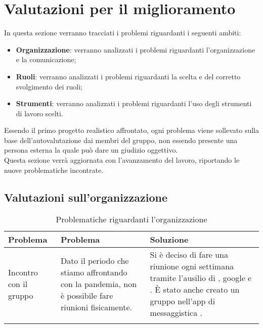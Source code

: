 \section{Valutazioni per il miglioramento}
In questa sezione verranno tracciati i problemi riguardanti i seguenti ambiti:
\begin{itemize}
	\item \textbf{Organizzazione}: verranno analizzati i problemi riguardanti l'organizzazione e la comunicazione;
	\item \textbf{Ruoli}: verranno analizzati i problemi riguardanti la scelta e del corretto svolgimento dei ruoli;
	\item \textbf{Strumenti}: verranno analizzati i problemi riguardanti l'uso degli strumenti di lavoro scelti.
\end{itemize}
Essendo il primo progetto realistico affrontato, ogni problema viene sollevato sulla base dell'autovalutazione dai membri del gruppo, non essendo presente una persona esterna la quale può dare un giudizio oggettivo.\\
Questa sezione verrà aggiornata con l'avanzamento del lavoro, riportando le nuove problematiche incontrate.
	\subsection{Valutazioni sull'organizzazione}
	\begin{center}
		\begin{longtable}{|C{2cm}|p{6cm}|p{6cm}|}
			\hline
			\textbf{Problema} & \textbf{Problema} & \textbf{Soluzione}  \\ 			
			\hline
			\endhead
			
			\hline
			Incontro con il gruppo & Dato il periodo che stiamo affrontando con la pandemia, non è possibile fare riunioni fisicamente. & Si è deciso di fare una riunione ogni settimana tramite l'ausilio di , google  e . È stato anche creato un gruppo nell'app di messaggistica .\\
			\hline
			
			\hiderowcolors
			\caption{Problematiche riguardanti l'organizzazione}		
		\end{longtable}	
	\end{center}
